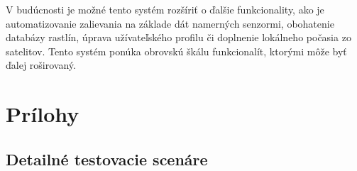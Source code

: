 \documentclass[twoside]{ctuthesis}
\theoremstyle{plain}
\theoremstyle{definition}
\theoremstyle{note}
\begin{document}
V budúcnosti je možné tento systém rozšíriť o ďalšie funkcionality, ako je automatizovanie zalievania na základe dát namerných senzormi, obohatenie databázy rastlín, úprava užívateľského profilu či doplnenie lokálneho počasia zo satelitov. Tento systém ponúka obrovskú škálu funkcionalít, ktorými môže byť ďalej roširovaný.

\printindex
\appendix
\chapter{Prílohy}
\section{Detailné testovacie scenáre}
\label{sec:scenare}

\end{document}
